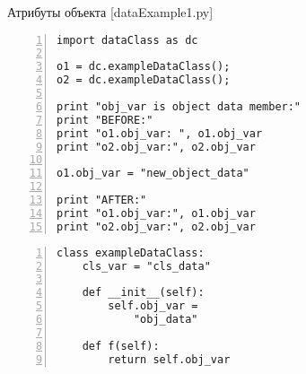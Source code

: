 \documentclass[hyperref={pdftex,unicode}]{beamer}
\begin{document}
\begin{frame}[fragile]{Атрибуты объекта [dataExample1.py]}
\begin{minipage}{0.6\linewidth}
    \begin{lstlisting}[numbers=left,basicstyle=\scriptsize\ttfamily]
import dataClass as dc                                                                          
                                                                                                
o1 = dc.exampleDataClass();                                                                     
o2 = dc.exampleDataClass();                                                                     
                                                                                                
print "obj_var is object data member:"                                                             
print "BEFORE:"                                                                                 
print "o1.obj_var: ", o1.obj_var                                                                
print "o2.obj_var:", o2.obj_var                                                                 
                                                                                                
o1.obj_var = "new_object_data"                                                                  
                                                                                                
print "AFTER:"                                                                                  
print "o1.obj_var:", o1.obj_var                                                                
print "o2.obj_var:", o2.obj_var  
    \end{lstlisting}
\end{minipage}
\hfill
\begin{minipage}{0.35\linewidth}
    \begin{lstlisting}[numbers=left,basicstyle=\tiny\ttfamily,numbers=none]
class exampleDataClass:                                                                                                      
    cls_var = "cls_data"                                                                        

    def __init__(self):                                                                         
        self.obj_var =
            "obj_data"   
                                                            
    def f(self):                                                                                
        return self.obj_var
    \end{lstlisting}
\end{minipage}
\end{frame}
\end{document}
